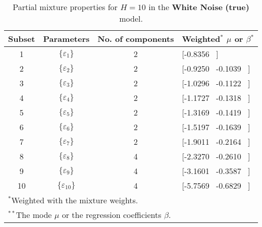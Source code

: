 \footnotesize{  
{ \renewcommand{\arraystretch}{1.3} 
\begin{longtable}{cccp{3.6cm}} 
\caption{Partial mixture properties for $H=10$ in the \textbf{White Noise} \textbf{(true)} model.} 
\label{tab:pmits_WN_ML} \\ 
 Subset & Parameters & No. of components  & Weighted$^{*}$ $\mu$ or $\beta$$^{*}$ \\ \hline 
1 & $\{\varepsilon_{1}\}$ & 2 & [-0.8356 \, ]   \\ [1ex] 
2 & $\{\varepsilon_{2}\}$ & 2 & [-0.9250 \, -0.1039 \, ]   \\ [1ex] 
3 & $\{\varepsilon_{3}\}$ & 2 & [-1.0296 \, -0.1122 \, ]   \\ [1ex] 
4 & $\{\varepsilon_{4}\}$ & 2 & [-1.1727 \, -0.1318 \, ]   \\ [1ex] 
5 & $\{\varepsilon_{5}\}$ & 2 & [-1.3169 \, -0.1419 \, ]   \\ [1ex] 
6 & $\{\varepsilon_{6}\}$ & 2 & [-1.5197 \, -0.1639 \, ]   \\ [1ex] 
7 & $\{\varepsilon_{7}\}$ & 2 & [-1.9011 \, -0.2164 \, ]   \\ [1ex] 
8 & $\{\varepsilon_{8}\}$ & 4 & [-2.3270 \, -0.2610 \, ]   \\ [1ex] 
9 & $\{\varepsilon_{9}\}$ & 4 & [-3.1601 \, -0.3587 \, ]   \\ [1ex] 
10 & $\{\varepsilon_{10}\}$ & 4 & [-5.7569 \, -0.6829 \, ]   \\ [1ex] 
\hline 
 \multicolumn{4}{l}{\footnotesize{$^{*}$Weighted with the mixture weights.}} \\ 
 \multicolumn{4}{l}{\footnotesize{$^{**}$The mode $\mu$ or the regression coefficients $\beta$.}} \\ 
\end{longtable} 
} 
} 
